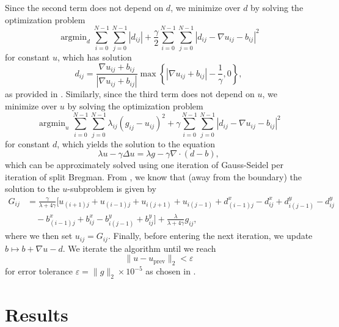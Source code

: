 \documentclass[11pt,reqno,twoside]{amsart}
\newcommand{\nn}{\nonumber}
\theoremstyle{plain}
\theoremstyle{definition}
\newcommand{\argmin}{\operatorname{argmin}}
\numberwithin{figure}{section}
\numberwithin{equation}{section}
\begin{document}
Since the second term does not depend on $d$, we minimize over $d$ by solving the optimization problem
\begin{equation*}
\argmin_{d} \sum_{i=0}^{N-1} \sum_{j=0}^{N-1} |d_{ij}|+\frac{\gamma}{2}\sum_{i=0}^{N-1} \sum_{j=0}^{N-1} |d_{ij}-\nabla u_{ij} - b_{ij}|^2
\end{equation*}
for constant $u$, which has solution
\begin{equation*}
d_{ij} = \frac{\nabla u_{ij} + b_{ij}}{|\nabla u_{ij} + b_{ij}|} \max\left\{|\nabla u_{ij} + b_{ij}|-\frac{1}{\gamma}, 0\right\},
\end{equation*}
as provided in \cite{ge2012b}.  Similarly, since the third term does not depend on $u$, we minimize over $u$ by solving the optimization problem
\begin{equation*}
\argmin_{u} \sum_{i=0}^{N-1} \sum_{j=0}^{N-1} \lambda_{ij} (g_{ij} - u_{ij})^2 + \gamma\sum_{i=0}^{N-1} \sum_{j=0}^{N-1} |d_{ij}-\nabla u_{ij} - b_{ij}|^2
\end{equation*}
for constant $d$, which yields the solution to the equation
\begin{equation*}
\lambda u - \gamma \Delta u = \lambda g - \gamma \nabla \cdot (d-b),
\end{equation*}
which can be approximately solved using one iteration of Gauss-Seidel per iteration of split Bregman. From \cite{go2009}, we know that (away from the boundary) the solution to the $u$-subproblem is given by
\begin{align*}
G_{ij} &= \frac{\gamma}{\lambda+4\gamma}\Big[u_{(i+1)j} + u_{(i-1)j} + u_{i(j+1)} + u_{i(j-1)} + d_{(i-1)j}^x - d_{ij}^x + d_{i(j-1)}^y - d_{ij}^y \nn\\ &\quad- b_{(i-1)j}^x + b_{ij}^x - b_{i(j-1)}^y + b_{ij}^y \Big] + \frac{\lambda}{\lambda+4\gamma}g_{ij},
\end{align*}
where we then set $u_{ij} = G_{ij}$.  Finally, before entering the next iteration, we update $b \mapsto b+\nabla u - d$.  We iterate the algorithm until we reach \begin{equation*}
\|u - u_{\text{prev}}\|_2 < \varepsilon
\end{equation*}
for error tolerance $\varepsilon = \|g\|_2 \times 10^{-5}$ as chosen in \cite{ge2012}.

\newpage 

\section{Results}
\end{document}
